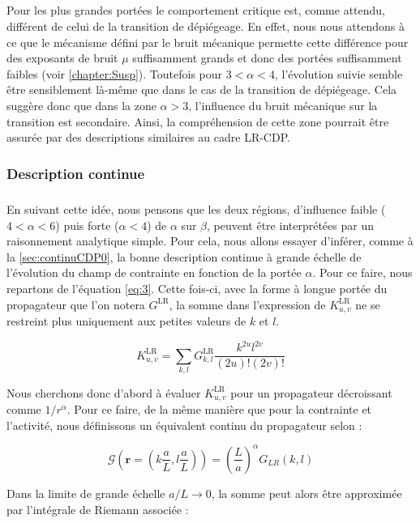 \subparagraph{}Pour les plus grandes portées le comportement critique est, comme attendu, différent de celui de la transition de dépiégeage. En effet, nous nous attendons à ce que le mécanisme défini par le bruit mécanique permette cette différence pour des exposants de bruit $\mu$ suffisamment grands et donc des portées suffisamment faibles (voir \autoref{chapter:Susp}). Toutefois pour $3<\alpha<4$, l'évolution suivie semble être sensiblement là-même que dans le cas de la transition de dépiégeage. Cela suggère donc que dans la zone $\alpha > 3$, l'influence du bruit mécanique sur la transition est secondaire. Ainsi, la compréhension de cette zone pourrait être assurée par des descriptions similaires au cadre LR-CDP.

\subsubsection{Description continue}

\subparagraph{}En suivant cette idée, nous pensons que les deux régions, d'influence faible ($4<\alpha < 6$) puis forte ($\alpha < 4$) de $\alpha$ sur $\beta$, peuvent être interprétées par un raisonnement analytique simple. Pour cela, nous allons essayer d'inférer, comme à la \autoref{sec:continuCDP0}, la bonne description continue à grande échelle de l'évolution du champ de contrainte en fonction de la portée $\alpha$. Pour ce faire, nous repartons de l'équation \autoref{eq:3}. Cette fois-ci, avec la forme à longue portée du propagateur que l'on notera $G^\text{LR}$, la somme dans l'expression de $K^\text{LR}_{u,v}$ ne se restreint plus uniquement aux petites valeurs de $k$ et $l$. 

\begin{equation}
	K^\text{LR}_{u,v} = \sum_{k,l}G^\text{LR}_{k,l}\frac{k^{2u}l^{2v}}{(2u)!(2v)!}
	\label{eq:sommekuv}
\end{equation}

Nous cherchons donc d'abord à évaluer $K^\text{LR}_{u,v}$ pour un propagateur décroissant comme $1/r^\alpha$. Pour ce faire, de la même manière que pour la contrainte et l'activité, nous définissons un équivalent continu du propagateur selon :

\begin{equation}
    \mathcal{G}\left(\mathbf{r}=(k\frac{a}{L},l\frac{a}{L})\right) = \left(\frac{L}{a}\right)^\alpha G_{LR}(k,l)
    \label{eq:rescaled:propagator}
\end{equation}

\noindent Dans la limite de grande échelle $a/L \rightarrow 0$, la somme peut  alors être approximée par l'intégrale de Riemann associée :

